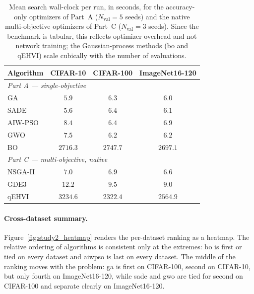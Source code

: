 \begin{table}[ht]
    \centering
    \caption{Mean search wall-clock per run, in seconds, for the accuracy-only optimizers of Part~A ($N_{\mathrm{val}}=5$ seeds) and the native multi-objective optimizers of Part~C ($N_{\mathrm{val}}=3$ seeds). Since the benchmark is tabular, this reflects optimizer overhead and not network training; the Gaussian-process methods (\acrshort{bo} and qEHVI) scale cubically with the number of evaluations.}
    \label{tab:study2_time}
    \begin{tabular}{lccc}
        \toprule
        \textbf{Algorithm} & \textbf{CIFAR-10} & \textbf{CIFAR-100} & \textbf{ImageNet16-120} \\
        \midrule
        \multicolumn{4}{l}{\textit{Part A --- single-objective}} \\
        GA      & $5.9$    & $6.3$    & $6.0$    \\
        SADE    & $5.6$    & $6.4$    & $6.1$    \\
        AIW-PSO & $8.4$    & $6.4$    & $6.9$    \\
        GWO     & $7.5$    & $6.2$    & $6.2$    \\
        BO      & $2716.3$ & $2747.7$ & $2697.1$ \\
        \midrule
        \multicolumn{4}{l}{\textit{Part C --- multi-objective, native}} \\
        NSGA-II & $7.0$    & $6.9$    & $6.6$    \\
        GDE3    & $12.2$   & $9.5$    & $9.0$    \\
        qEHVI   & $3234.6$ & $2322.4$ & $2564.9$ \\
        \bottomrule
    \end{tabular}
\end{table}

\paragraph{Cross-dataset summary.}
Figure~\ref{fig:study2_heatmap} renders the per-dataset ranking as a heatmap. The relative ordering of algorithms is consistent only at the extremes: \acrshort{bo} is first or tied on every dataset and \acrshort{aiwpso} is last on every dataset. The middle of the ranking moves with the problem: \acrshort{ga} is first on CIFAR-100, second on CIFAR-10, but only fourth on ImageNet16-120, while \acrshort{sade} and \acrshort{gwo} are tied for second on CIFAR-100 and separate clearly on ImageNet16-120.

